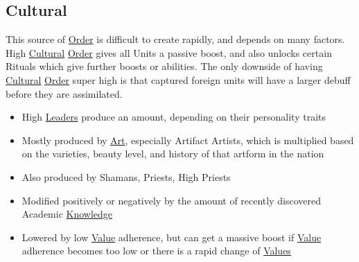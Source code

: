 \documentclass[11pt]{article}
\begin{document}
\subsection{Cultural \label{org992a868} \label{orgcacd29d}}
\label{sec:org77ffd07}
This source of \hyperref[orgd146db7]{Order} is difficult to create rapidly, and depends on many factors. High \hyperref[org992a868]{Cultural} \hyperref[orgd146db7]{Order} gives all Units a passive boost, and also unlocks certain Rituals which give further boosts or abilities. The only downside of having \hyperref[org992a868]{Cultural} \hyperref[orgd146db7]{Order} super high is that captured foreign units will have a larger debuff before they are assimilated.\\
\begin{itemize}
\item High \hyperref[org841e9de]{Leaders} produce an amount, depending on their personality traits\\
\item Mostly produced by \hyperref[org978f042]{Art}, especially Artifact Artists, which is multiplied based on the varieties, beauty level, and history of that artform in the nation\\
\item Also produced by Shamans, Priests, High Priests\\
\item Modified positively or negatively by the amount of recently discovered Academic \hyperref[orgd7203c2]{Knowledge}\\
\item Lowered by low \hyperref[orgcfc0c4f]{Value} adherence, but can get a massive boost if \hyperref[orgcfc0c4f]{Value} adherence becomes too low or there is a rapid change of \hyperref[orge4a3133]{Values}\\
\end{itemize}
\end{document}
